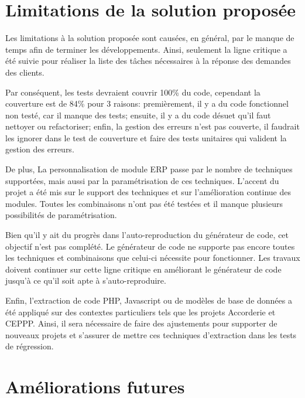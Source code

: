 \section{Limitations de la solution proposée}\label{sec:Limitations}

Les limitations à la solution proposée sont causées, en général, par le manque de temps afin de terminer les développements. Ainsi, seulement la ligne critique a été suivie pour réaliser la liste des tâches nécessaires à la réponse des demandes des clients.

Par conséquent, les tests devraient couvrir 100\% du code, cependant la couverture est de 84\% pour 3 raisons: premièrement, il y a du code fonctionnel non testé, car il manque des tests; ensuite, il y a du code désuet qu’il faut nettoyer ou refactoriser; enfin, la gestion des erreurs n’est pas couverte, il faudrait les ignorer dans le test de couverture et faire des tests unitaires qui valident la gestion des erreurs.

De plus, La personnalisation de module ERP passe par le nombre de techniques supportées, mais aussi par la paramétrisation de ces techniques. L'accent du projet a été mis sur le support des techniques et sur l'amélioration continue des modules. Toutes les combinaisons n'ont pas été testées et il manque plusieurs possibilités de paramétrisation.


Bien qu'il y ait du progrès dans l'auto-reproduction du générateur de code, cet objectif n'est pas complété. Le générateur de code ne supporte pas encore toutes les techniques et combinaisons que celui-ci nécessite pour fonctionner. Les travaux doivent continuer sur cette ligne critique en améliorant le générateur de code jusqu'à ce qu'il soit apte à s'auto-reproduire.

Enfin, l'extraction de code PHP, Javascript ou de modèles de base de données a été appliqué sur des contextes particuliers tels que les projets Accorderie et CEPPP. Ainsi, il sera nécessaire de faire des ajustements pour supporter de nouveaux projets et s'assurer de mettre ces techniques d'extraction dans les tests de régression.

\section{Améliorations futures}

